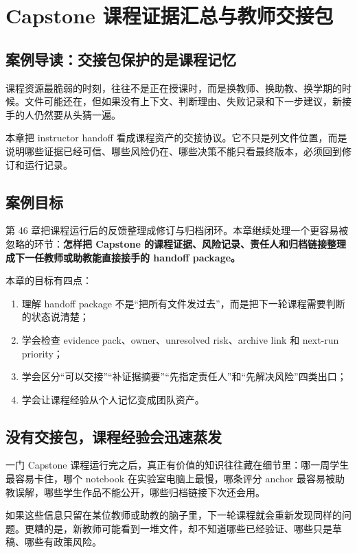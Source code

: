 \chapter{Capstone 课程证据汇总与教师交接包}

\section{案例导读：交接包保护的是课程记忆}

课程资源最脆弱的时刻，往往不是正在授课时，而是换教师、换助教、换学期的时候。文件可能还在，但如果没有上下文、判断理由、失败记录和下一步建议，新接手的人仍然要从头猜一遍。

本章把 instructor handoff 看成课程资产的交接协议。它不只是列文件位置，而是说明哪些证据已经可信、哪些风险仍在、哪些决策不能只看最终版本，必须回到修订和运行记录。

\section{案例目标}

第 46 章把课程运行后的反馈整理成修订与归档闭环。本章继续处理一个更容易被忽略的环节：\textbf{怎样把 Capstone 的课程证据、风险记录、责任人和归档链接整理成下一任教师或助教能直接接手的 handoff package。}

本章的目标有四点：

\begin{enumerate}
    \item 理解 handoff package 不是“把所有文件发过去”，而是把下一轮课程需要判断的状态说清楚；
    \item 学会检查 evidence pack、owner、unresolved risk、archive link 和 next-run priority；
    \item 学会区分“可以交接”“补证据摘要”“先指定责任人”和“先解决风险”四类出口；
    \item 学会让课程经验从个人记忆变成团队资产。
\end{enumerate}

\section{没有交接包，课程经验会迅速蒸发}

一门 Capstone 课程运行完之后，真正有价值的知识往往藏在细节里：哪一周学生最容易卡住，哪个 notebook 在实验室电脑上最慢，哪条评分 anchor 最容易被助教误解，哪些学生作品不能公开，哪些归档链接下次还会用。

如果这些信息只留在某位教师或助教的脑子里，下一轮课程就会重新发现同样的问题。更糟的是，新教师可能看到一堆文件，却不知道哪些已经验证、哪些只是草稿、哪些有政策风险。

